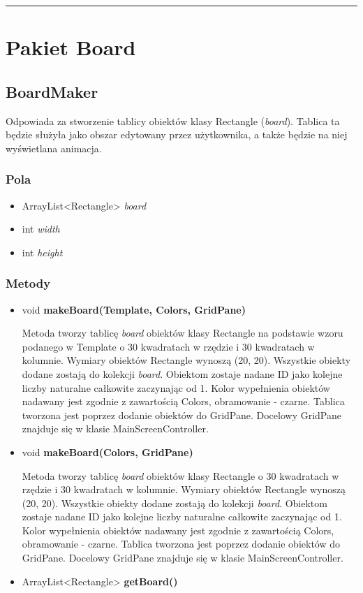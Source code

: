 \documentclass[a4paper,11pt]{article}
\newcommand{\linia}{\rule{\linewidth}{0.4mm}}
\begin{document}
\noindent\linia

\section{Pakiet Board}

\subsection{BoardMaker}
Odpowiada za stworzenie tablicy obiektów klasy Rectangle (\textit{board}). Tablica ta będzie służyła jako obszar edytowany przez użytkownika, a także będzie na niej wyświetlana animacja.
\subsubsection{Pola}
\begin{itemize}
\item ArrayList<Rectangle> \textit{board}
\item int \textit{width}
\item int \textit{height}
\end{itemize}
\subsubsection{Metody}
\begin{itemize}
\item void \textbf{makeBoard(Template, Colors, GridPane)}

Metoda tworzy tablicę \textit{board} obiektów klasy Rectangle na podstawie wzoru podanego w Template o 30 kwadratach w rzędzie i 30 kwadratach w kolumnie.
Wymiary obiektów Rectangle wynoszą (20, 20).
Wszystkie obiekty dodane zostają do kolekcji \textit{board}.
Obiektom zostaje nadane ID jako kolejne liczby naturalne całkowite zaczynając od 1.
Kolor wypełnienia obiektów nadawany jest zgodnie z zawartością Colors, obramowanie - czarne.
Tablica tworzona jest poprzez dodanie obiektów do  GridPane.
Docelowy GridPane znajduje się w klasie MainScreenController.
\item void \textbf{makeBoard(Colors, GridPane)}

Metoda tworzy tablicę \textit{board} obiektów klasy Rectangle o 30 kwadratach w rzędzie i 30 kwadratach w kolumnie.
Wymiary obiektów Rectangle wynoszą (20, 20).
Wszystkie obiekty dodane zostają do kolekcji \textit{board}.
Obiektom zostaje nadane ID jako kolejne liczby naturalne całkowite zaczynając od 1.
Kolor wypełnienia obiektów nadawany jest zgodnie z zawartością Colors, obramowanie - czarne.
Tablica tworzona jest poprzez dodanie obiektów do  GridPane.
Docelowy GridPane znajduje się w klasie MainScreenController.

\item ArrayList<Rectangle> \textbf{getBoard()}
\end{itemize}
\end{document}
